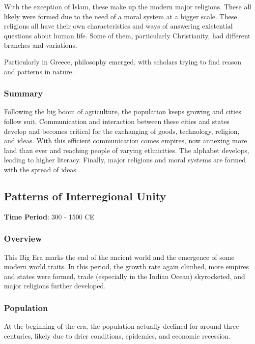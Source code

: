 \documentclass[11pt]{article}
\begin{document}
With the exception of Islam, these make up the modern major religions. These all likely were formed due to the need of a moral system at a bigger scale. These religions all have their own characteristics and ways of answering existential questions about human life. Some of them, particularly Christianity, had different branches and variations.

Particularly in Greece, philosophy emerged, with scholars trying to find reason and patterns in nature.

\subsubsection{Summary}
\label{sec:org7339670}

Following the big boom of agriculture, the population keeps growing and cities follow suit. Communication and interaction between these cities and states develop and becomes critical for the exchanging of goods, technology, religion, and ideas. With this efficient communication comes empires, now annexing more land than ever and reaching people of varying ethnicities. The alphabet develops, leading to higher literacy. Finally, major religions and moral systems are formed with the spread of ideas.
\subsection{Patterns of Interregional Unity}
\label{sec:orgebf904a}

\textbf{Time Period}: 300 - 1500 CE

\subsubsection{Overview}
\label{sec:org70b04bf}

This Big Era marks the end of the ancient world and the emergence of some modern world traits. In this period, the growth rate again climbed, more empires and states were formed, trade (especially in the Indian Ocean) skyrocketed, and major religions further developed.

\subsubsection{Population}
\label{sec:org6e67f91}

At the beginning of the era, the population actually declined for around three centuries, likely due to drier conditions, epidemics, and economic recession.
\end{document}
